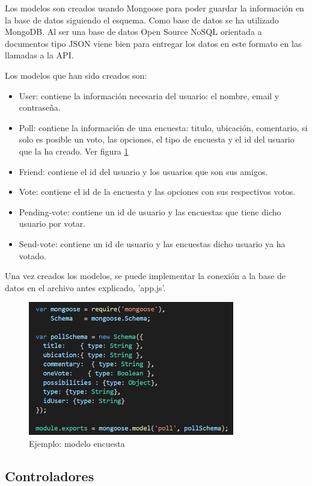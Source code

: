 \documentclass[a4paper, 12pt]{book}
\begin{document}
Los modelos son creados usando Mongoose para poder guardar la informaci\'on en la base de datos siguiendo el esquema. Como base de datos se ha utilizado MongoDB. Al ser una base de datos Open Source NoSQL orientada a documentos tipo JSON viene bien para entregar los datos en este formato en las llamadas a la API. 

Los modelos que han sido creados son:
\begin{itemize}
\item User: contiene la informaci\'on necesaria del usuario: el nombre, email y contrase\~na.
\item Poll: contiene la informaci\'on de una encuesta: titulo, ubicaci\'on, comentario, si solo es posible un voto, las opciones, el tipo de encuesta y el id del usuario que la ha creado. Ver figura \ref{f:ej_model}
\item Friend: contiene el id del usuario y los usuarios que son sus amigos.
\item Vote: contiene el id de la encuesta y las opciones con sus respectivos votos.
\item Pending-vote: contiene un id de usuario y las encuestas que tiene dicho usuario por votar.
\item Send-vote: contiene un id de usuario y las encuestas dicho usuario ya ha votado. 
\end{itemize}

Una vez creados los modelos, se puede implementar la conexi\'on a la base de datos en el archivo antes explicado, 'app.js'.

\begin{figure}[H]
  \centering
  \includegraphics[width=9cm, keepaspectratio]{img/model.png}
  \caption{Ejemplo: modelo encuesta}
  \label{f:ej_model}
\end{figure}


\subsection{Controladores} 
\label{sec:controladores}
\end{document}

